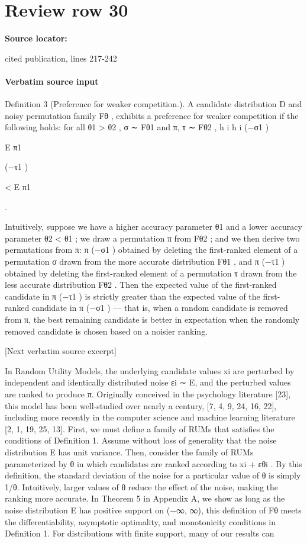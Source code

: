 \documentclass[10pt]{article}
\begin{document}
\section*{Review row 30}
\textbf{Source locator:} {\footnotesize\raggedright cited publication, lines 217-\allowbreak{}242\par}
\paragraph{Verbatim source input}
\begin{ReviewVerbatim}
Definition 3 (Preference for weaker competition.). A candidate distribution D and noisy permutation family
Fθ , exhibits a preference for weaker competition if the following holds: for all θ1 > θ2 , σ ∼ Fθ1 and
π, τ ∼ Fθ2 ,
h
i
h
i
(−{σ1 })

E π1

(−{τ1 })

< E π1

.

Intuitively, suppose we have a higher accuracy parameter θ1 and a lower accuracy parameter θ2 < θ1 ; we
draw a permutation π from Fθ2 ; and we then derive two permutations from π: π (−{σ1 }) obtained by deleting
the first-ranked element of a permutation σ drawn from the more accurate distribution Fθ1 , and π (−{τ1 })
obtained by deleting the first-ranked element of a permutation τ drawn from the less accurate distribution
Fθ2 .
Then the expected value of the first-ranked candidate in π (−{τ1 }) is strictly greater than the expected
value of the first-ranked candidate in π (−{σ1 }) — that is, when a random candidate is removed from π, the
best remaining candidate is better in expectation when the randomly removed candidate is chosen based on
a noisier ranking.

[Next verbatim source excerpt]

In Random Utility Models, the underlying candidate values xi are perturbed by independent and identically
distributed noise εi ∼ E, and the perturbed values are ranked to produce π. Originally conceived in the
psychology literature [23], this model has been well-studied over nearly a century, [7, 4, 9, 24, 16, 22],
including more recently in the computer science and machine learning literature [2, 1, 19, 25, 13].
First, we must define a family of RUMs that satisfies the conditions of Definition 1. Assume without loss of
generality that the noise distribution E has unit variance. Then, consider the family of RUMs parameterized
by θ in which candidates are ranked according to xi + εθi . By this definition, the standard deviation of the
noise for a particular value of θ is simply 1/θ. Intuitively, larger values of θ reduce the effect of the noise,
making the ranking more accurate. In Theorem 5 in Appendix A, we show as long as the noise distribution
E has positive support on (−∞, ∞), this definition of Fθ meets the differentiability, asymptotic optimality,
and monotonicity conditions in Definition 1. For distributions with finite support, many of our results can


\end{ReviewVerbatim}
\end{document}
